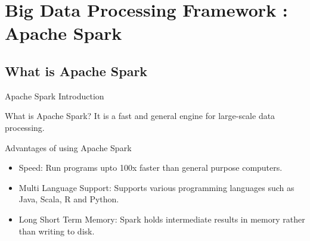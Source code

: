 \documentclass[newPxFont]{beamer}
\begin{document}
\section{Big Data Processing Framework : Apache Spark}
\subsection{What is Apache Spark}

\begin{frame}[c]{Apache Spark Introduction}
	\begin{alertblock}{What is Apache Spark?}
    	It is a fast and general engine for large-scale data processing.
	\end{alertblock}
    
    \begin{block}{Advantages of using Apache Spark}
    	\begin{itemize}
        	\item{\alert{Speed: } Run programs upto 100x faster than general purpose computers.}
            \item{\alert{Multi Language Support: } Supports various programming languages such as Java, Scala, R and Python.}
            \item{\alert{Long Short Term Memory: } Spark holds intermediate results in memory rather than writing to disk.}
        \end{itemize}
    \end{block}

\end{frame}
\end{document}
